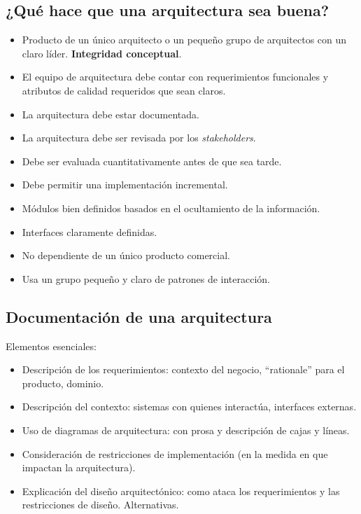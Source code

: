 \documentclass[]{article}
\begin{document}
\subsection{¿Qué hace que una arquitectura sea buena?}
\begin{itemize}
	\item Producto de un único arquitecto o un pequeño grupo de arquitectos con un claro líder. \textbf{Integridad conceptual}.
	\item El equipo de arquitectura debe contar con requerimientos funcionales y atributos de calidad requeridos que sean claros.
	\item La arquitectura debe estar documentada.
	\item La arquitectura debe ser revisada por los \emph{stakeholders}.
	\item Debe ser evaluada cuantitativamente antes de que sea tarde.
	\item Debe permitir una implementación incremental.
	\item Módulos bien definidos basados en el ocultamiento de la información.
	\item Interfaces claramente definidas.
	\item No dependiente de un único producto comercial.
	\item Usa un grupo pequeño y claro de patrones de interacción.
\end{itemize}


\subsection{Documentación de una arquitectura}
Elementos esenciales:
\begin{itemize}
    \item Descripción de los requerimientos: contexto del negocio, “rationale” para el producto, dominio.
    \item Descripción del contexto: sistemas con quienes interactúa, interfaces externas.
    \item Uso de diagramas de arquitectura: con prosa y descripción de cajas y líneas.
    \item Consideración de restricciones de implementación (en la medida en que impactan la arquitectura).
    \item Explicación del diseño arquitectónico: como ataca los requerimientos y las restricciones de diseño. Alternativas.
\end{itemize}
\end{document}

